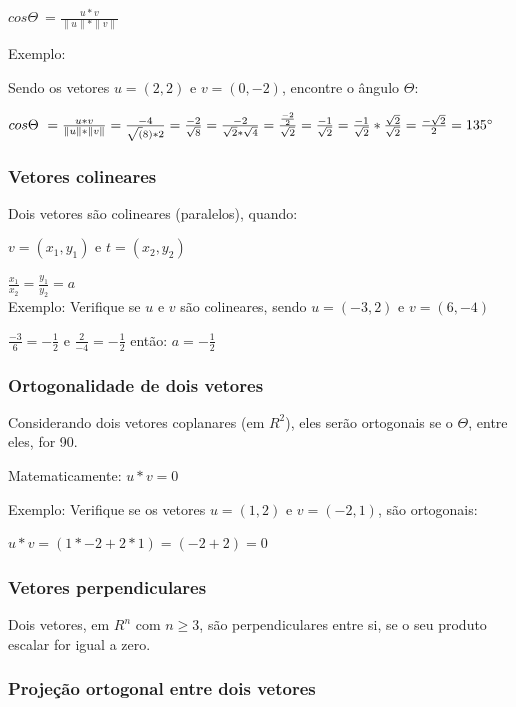 \documentclass[12pt]{article}
\begin{document}
\(cos \Theta\ = \frac{u * v}{\|u\|*\|v\|}\)

Exemplo:

Sendo os vetores \(u = (2,2)\) e \(v=(0, -2)\), encontre o ângulo $\Theta$:

\(cos \Theta\ = \frac{u * v}{\|u\|*\|v\|} = \frac{-4}{\sqrt(8)*2} = \frac{-2}{\sqrt{8}}=\frac{-2}{\sqrt{2}*\sqrt{4}}=\frac{\frac{-2}{2}}{\sqrt{2}} = \frac{-1}{\sqrt{2}} = \frac{-1}{\sqrt{2}} * \frac{\sqrt{2}}{\sqrt{2}} = \frac{-\sqrt{2}}{2} = 135\degree\)

\subsubsection{Vetores colineares}

Dois vetores são colineares (paralelos), quando:

\(v = (x_{1}, y_{1})\) e \(t = (x_{2}, y_{2})\)

\(\frac{x_{1}}{x_{2}} = \frac{y_{1}}{y_{2}} = a\)
\\

Exemplo: Verifique se \(u\) e \(v\) são colineares, sendo \(u = (-3, 2)\) e \(v=(6,-4)\)

\(\frac{-3}{6} = -\frac{1}{2}\) e \(\frac{2}{-4} = -\frac{1}{2}\) então: \(a = -\frac{1}{2}\)

\subsubsection{Ortogonalidade de dois vetores}

Considerando dois vetores coplanares (em \(R^{2}\)), eles serão ortogonais se o $\Theta$, entre eles, for 90\degree.

Matematicamente: \(u * v = 0\)

Exemplo: Verifique se os vetores \(u = (1, 2)\) e \(v = (-2, 1)\), são ortogonais:

\(u * v = (1 * -2 + 2 * 1) = (-2 + 2) = 0\)


\subsubsection{Vetores perpendiculares}

Dois vetores, em \(R^{n}\) com \(n \geq 3\), são perpendiculares entre si, se o seu produto escalar for igual a zero.

\subsubsection{Projeção ortogonal entre dois vetores}
\end{document}
